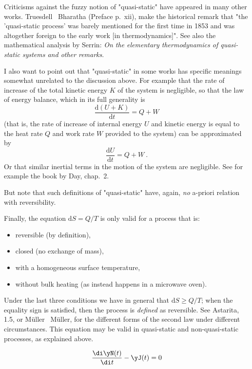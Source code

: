 Criticisms against the fuzzy notion of "quasi-static" have appeared in many other works. Truesdell \amp\ Bharatha (Preface p.~xii), make the historical remark that "the 'quasi-static process' was barely mentioned for the first time in 1853 and was altogether foreign to the early work [in thermodynamics]". See also the mathematical analysis by Serrin: \emph{On the elementary thermodynamics of quasi-static systems and other remarks}.

\medskip

I also want to point out that "quasi-static" in some works has specific meanings somewhat unrelated to the discussion above. For example that the rate of increase of the total kinetic energy $K$ of the system is negligible, so that the law of energy balance, which in its full generality is
$$ \frac{\mathrm{d}(U+K)}{\mathrm{d}t}  = Q + W$$
(that is, the rate of increase of internal energy $U$ and kinetic energy is equal to the heat rate $Q$ and work rate $W$ provided to the system) can be approximated by
$$ \frac{\mathrm{d}U}{\mathrm{d}t}  = Q + W \ .$$
Or that similar inertial terms in the motion of the system are negligible. See for example the book by Day, chap.~2.

But note that such definitions of "quasi-static" have, again, \emph{no} a-priori relation with reversibility.

\medskip

Finally, the equation $\mathrm{d}S = Q/T$ is only valid for a process that is:
\begin{itemize}
\item reversible (by definition),
\item closed (no exchange of mass),
\item with a homogeneous surface temperature,
\item without bulk heating (as instead happens in a microwave oven).
\end{itemize}
Under the last three conditions we have in general that $\mathrm{d}S \ge Q/T$; when the equality sign is satisfied, then the process is \emph{defined} as reversible. See Astarita, \sect\,1.5, or M{\"u}ller \amp\ M{\"u}ller, for the different forms of the second law under different circumstances. This equation may be valid in quasi-static and non-quasi-static processes, as explained above.



\begin{equation*}
      \frac{\di\yN(t)}{\di t}- \yJ(t) = 0
\end{equation*}

